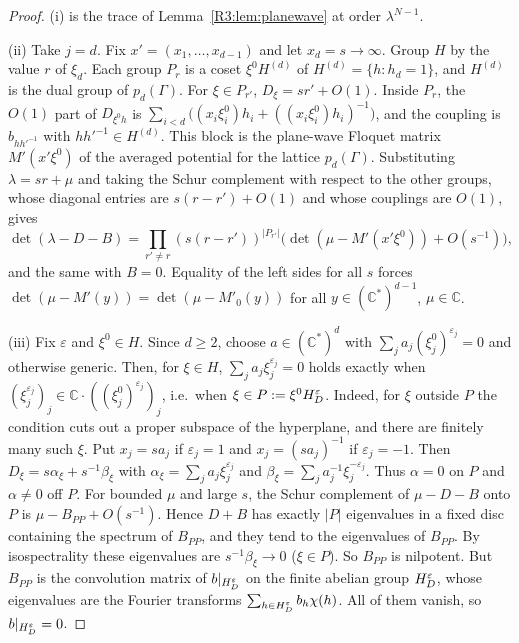 \documentclass[11pt]{amsart}
\theoremstyle{definition}
\theoremstyle{remark}
\providecommand{\C}{\mathbb C}
\begin{document}
\begin{proof}
(i) is the trace of Lemma~\ref{R3:lem:planewave} at order $\lambda^{N-1}$.

(ii) Take $j=d$. Fix $x'=(x_1,\dots,x_{d-1})$ and let $x_d=s\to\infty$. Group
$H$ by the value $r$ of $\xi_d$. Each group $P_r$ is a coset $\xi^0H^{(d)}$ of
$H^{(d)}=\{h:h_d=1\}$, and $H^{(d)}$ is the dual group of $p_d(\Gamma)$. For
$\xi\in P_{r'}$, $D_\xi=sr'+O(1)$. Inside $P_r$, the $O(1)$ part of
$D_{\xi^0h}$ is $\sum_{i<d}\bigl((x_i\xi^0_i)h_i+((x_i\xi^0_i)h_i)^{-1}\bigr)$, and
the coupling is $b_{hh'^{-1}}$ with $hh'^{-1}\in H^{(d)}$. This block is the
plane-wave Floquet matrix $M'(x'\xi^0)$ of the averaged potential for the lattice
$p_d(\Gamma)$. Substituting $\lambda=sr+\mu$ and taking the Schur complement with
respect to the other groups, whose diagonal entries are $s(r-r')+O(1)$ and whose
couplings are $O(1)$, gives
\[
 \det(\lambda-D-B)=\prod_{r'\neq r}(s(r-r'))^{|P_{r'}|}\bigl(\det(\mu-M'(x'\xi^0))+O(s^{-1})\bigr),
\]
and the same with $B=0$. Equality of the left sides for all $s$ forces
$\det(\mu-M'(y))=\det(\mu-M'_0(y))$ for all $y\in(\C^*)^{d-1}$, $\mu\in\C$.

(iii) Fix $\varepsilon$ and $\xi^0\in H$. Since $d\ge2$, choose
$a\in(\C^*)^d$ with $\sum_ja_j(\xi^0_j)^{\varepsilon_j}=0$ and otherwise generic.
Then, for $\xi\in H$, $\sum_ja_j\xi_j^{\varepsilon_j}=0$ holds exactly when
$(\xi_j^{\varepsilon_j})_j\in\C\cdot((\xi^0_j)^{\varepsilon_j})_j$, i.e.\ when
$\xi\in P:=\xi^0H_{D}^{\varepsilon}$. Indeed, for $\xi$ outside $P$ the condition
cuts out a proper subspace of the hyperplane, and there are finitely many such
$\xi$. Put $x_j=sa_j$ if $\varepsilon_j=1$ and $x_j=(sa_j)^{-1}$ if
$\varepsilon_j=-1$. Then
$D_\xi=s\alpha_\xi+s^{-1}\beta_\xi$ with $\alpha_\xi=\sum_ja_j\xi_j^{\varepsilon_j}$
and $\beta_\xi=\sum_ja_j^{-1}\xi_j^{-\varepsilon_j}$. Thus $\alpha=0$ on $P$ and
$\alpha\ne0$ off $P$. For bounded $\mu$ and large $s$, the Schur complement of
$\mu-D-B$ onto $P$ is $\mu-B_{PP}+O(s^{-1})$. Hence $D+B$ has exactly $|P|$
eigenvalues in a fixed disc containing the spectrum of $B_{PP}$, and they tend
to the eigenvalues of $B_{PP}$. By isospectrality these eigenvalues are
$s^{-1}\beta_\xi\to0$ ($\xi\in P$). So $B_{PP}$ is nilpotent. But $B_{PP}$ is the
convolution matrix of $b|_{H_{D}^{\varepsilon}}$ on the finite abelian group
$H_{D}^{\varepsilon}$, whose eigenvalues are the Fourier transforms
$\sum_{h\in H_{D}^{\varepsilon}}b_h\chi(h)$. All of them vanish, so
$b|_{H_{D}^{\varepsilon}}=0$.


\end{proof}
\end{document}
